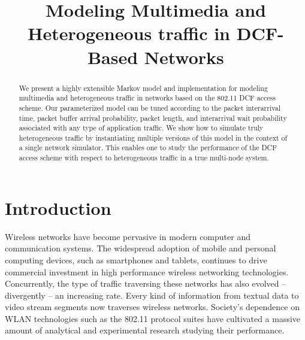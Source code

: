 \documentclass[conference]{IEEEtran}
\begin{document}
\title{Modeling Multimedia and Heterogeneous traffic in DCF-Based Networks}

\author{
}

\maketitle

\begin{abstract}
We present a highly extensible Markov model and implementation for modeling multimedia and heterogeneous traffic in networks based on the 802.11 DCF access scheme. Our parameterized model can be tuned according to the packet interarrival time, packet buffer arrival probability, packet length, and interarrival wait probability associated with any type of application traffic. We show how to simulate truly heterogeneous traffic by instantiating multiple versions of this model in the context of a single network simulator. This enables one to study the performance of the DCF access scheme with respect to heterogeneous traffic in a true multi-node system. 
\end{abstract}	


\IEEEpeerreviewmaketitle

\section{Introduction}
Wireless networks have become pervasive in modern computer and communication systems. The widespread adoption of mobile and personal computing devices, such as smartphones and tablets, continues to drive commercial investment in high performance wireless networking technologies. Concurrently, the type of traffic traversing these networks has also evolved -- divergently -- an increasing rate. Every kind of information from textual data to video stream segments now traverses wireless networks. Society's dependence on WLAN technologies such as the 802.11 protocol suites have cultivated a massive amount of analytical and experimental research studying their performance. 
\end{document}
